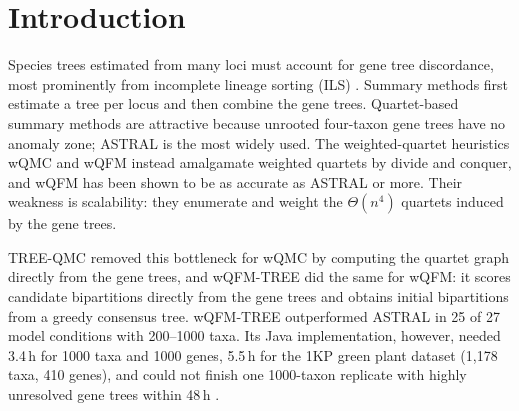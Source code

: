 \documentclass[11pt,a4paper]{article}
\newcommand{\wqfmtree}{wQFM-TREE}
\begin{document}
\section{Introduction}

Species trees estimated from many loci must account for gene tree discordance, most prominently
from incomplete lineage sorting (ILS) \citep{maddison1997,degnan2009}. Summary methods first
estimate a tree per locus and then combine the gene trees. Quartet-based summary methods are
attractive because unrooted four-taxon gene trees have no anomaly zone; ASTRAL
\citep{mirarab2014astral,mirarab2015astral2,zhang2018astral3} is the most widely used. The
weighted-quartet heuristics wQMC \citep{avni2015wqmc} and wQFM \citep{mahbub2021wqfm} instead
amalgamate weighted quartets by divide and conquer, and wQFM has been shown to be as accurate as
ASTRAL or more. Their weakness is scalability: they enumerate and weight the $\Theta(n^4)$ quartets
induced by the gene trees.

TREE-QMC \citep{han2023treeqmc} removed this bottleneck for wQMC by computing the quartet graph
directly from the gene trees, and \wqfmtree{} \citep{rafi2025wqfmtree} did the same for wQFM: it
scores candidate bipartitions directly from the gene trees and obtains initial bipartitions from a
greedy consensus tree. \wqfmtree{} outperformed ASTRAL in 25 of 27 model conditions with 200--1000
taxa. Its Java implementation, however, needed 3.4\,h for 1000 taxa and 1000 genes, 5.5\,h for the
1KP green plant dataset (1{,}178 taxa, 410 genes), and could not finish one 1000-taxon replicate
with highly unresolved gene trees within 48\,h \citep{rafi2025wqfmtree}.
\end{document}
